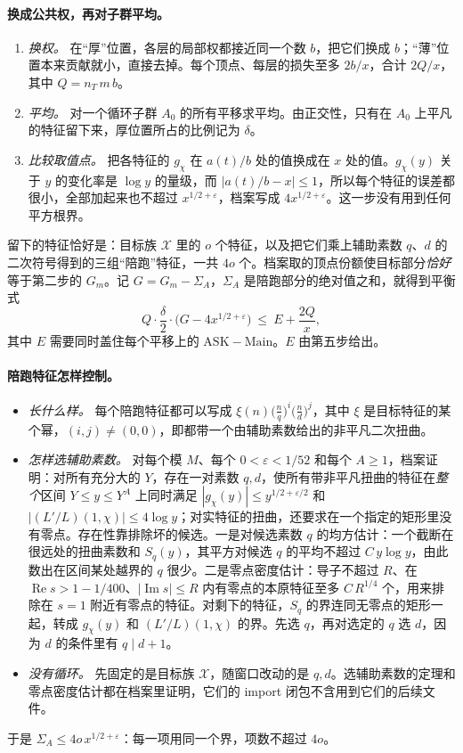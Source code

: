 \documentclass[11pt]{article}
\renewcommand{\Re}{\operatorname{Re}}
\renewcommand{\Im}{\operatorname{Im}}
\begin{document}
\paragraph{换成公共权，再对子群平均。}
\begin{enumerate}
\item \emph{换权。} 在“厚”位置，各层的局部权都接近同一个数 $b$，把它们换成 $b$；“薄”位置本来贡献就小，直接去掉。每个顶点、每层的损失至多 $2b/x$，合计 $2Q/x$，其中 $Q=n_T\,m\,b$。
\item \emph{平均。} 对一个循环子群 $A_0$ 的所有平移求平均。由正交性，只有在 $A_0$ 上平凡的特征留下来，厚位置所占的比例记为 $\delta$。
\item \emph{比较取值点。} 把各特征的 $g_\chi$ 在 $a(t)/b$ 处的值换成在 $x$ 处的值。$g_\chi(y)$ 关于 $y$ 的变化率是 $\log y$ 的量级，而 $|a(t)/b-x|\le1$，所以每个特征的误差都很小，全部加起来也不超过 $x^{1/2+\varepsilon}$，档案写成 $4x^{1/2+\varepsilon}$。这一步没有用到任何平方根界。
\end{enumerate}
留下的特征恰好是：目标族 $\mathcal X$ 里的 $o$ 个特征，以及把它们乘上辅助素数 $q$、$d$ 的二次符号得到的三组“陪跑”特征，一共 $4o$ 个。档案取的顶点份额使目标部分\emph{恰好}等于第二步的 $G_m$。记 $G=G_m-\Sigma_A$，$\Sigma_A$ 是陪跑部分的绝对值之和，就得到平衡式
\[
Q\cdot\frac\delta2\cdot\bigl(G-4x^{1/2+\varepsilon}\bigr)\ \le\ E+\frac{2Q}{x},
\]
其中 $E$ 需要同时盖住每个平移上的 $\mathrm{ASK}-\mathrm{Main}$。$E$ 由第五步给出。

\paragraph{陪跑特征怎样控制。}
\begin{itemize}
\item \emph{长什么样。} 每个陪跑特征都可以写成 $\xi(n)\bigl(\tfrac nq\bigr)^i\bigl(\tfrac nd\bigr)^j$，其中 $\xi$ 是目标特征的某个幂，$(i,j)\ne(0,0)$，即都带一个由辅助素数给出的非平凡二次扭曲。
\item \emph{怎样选辅助素数。} 对每个模 $M$、每个 $0<\varepsilon<1/52$ 和每个 $A\ge1$，档案证明：对所有充分大的 $Y$，存在一对素数 $q,d$，使所有带非平凡扭曲的特征在\emph{整个}区间 $Y\le y\le Y^A$ 上同时满足 $|g_\chi(y)|\le y^{1/2+\varepsilon/2}$ 和 $|(L'/L)(1,\chi)|\le4\log y$；对实特征的扭曲，还要求在一个指定的矩形里没有零点。存在性靠排除坏的候选。一是对候选素数 $q$ 的均方估计：一个截断在很远处的扭曲素数和 $S_q(y)$，其平方对候选 $q$ 的平均不超过 $C\,y\log y$，由此数出在区间某处越界的 $q$ 很少。二是零点密度估计：导子不超过 $R$、在 $\Re s>1-1/400$、$|\Im s|\le R$ 内有零点的本原特征至多 $C\,R^{1/4}$ 个，用来排除在 $s=1$ 附近有零点的特征。对剩下的特征，$S_q$ 的界连同无零点的矩形一起，转成 $g_\chi(y)$ 和 $(L'/L)(1,\chi)$ 的界。先选 $q$，再对选定的 $q$ 选 $d$，因为 $d$ 的条件里有 $q\mid d+1$。
\item \emph{没有循环。} 先固定的是目标族 $\mathcal X$，随窗口改动的是 $q,d$。选辅助素数的定理和零点密度估计都在档案里证明，它们的 import 闭包不含用到它们的后续文件。
\end{itemize}
于是 $\Sigma_A\le4o\,x^{1/2+\varepsilon}$：每一项用同一个界，项数不超过 $4o$。
\end{document}

